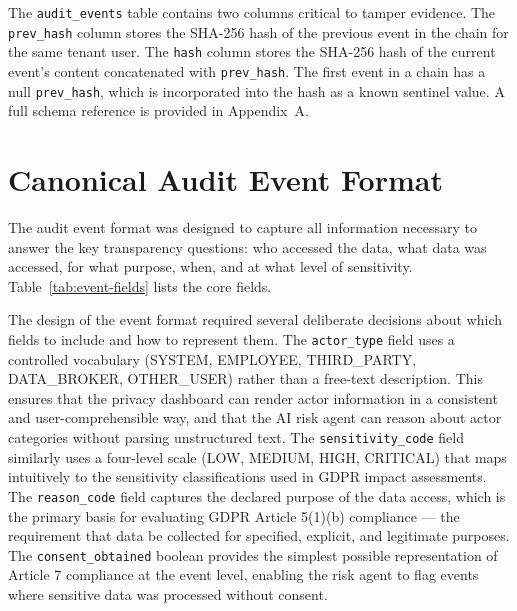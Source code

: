 \documentclass[a4paper,12pt,onecolumn]{report}
\begin{document}
The \texttt{audit\_events} table contains two columns critical to tamper evidence.
The \texttt{prev\_hash} column stores the SHA-256 hash of the previous event in the chain for the same tenant user.
The \texttt{hash} column stores the SHA-256 hash of the current event's content concatenated with \texttt{prev\_hash}.
The first event in a chain has a null \texttt{prev\_hash}, which is incorporated into the hash as a known sentinel value.
A full schema reference is provided in Appendix~A.

\section{Canonical Audit Event Format}

The audit event format was designed to capture all information necessary to answer the key transparency questions: who accessed the data, what data was accessed, for what purpose, when, and at what level of sensitivity.
Table~\ref{tab:event-fields} lists the core fields.

The design of the event format required several deliberate decisions about which fields to include and how to represent them.
The \texttt{actor\_type} field uses a controlled vocabulary (SYSTEM, EMPLOYEE, THIRD\_PARTY, DATA\_BROKER, OTHER\_USER) rather than a free-text description.
This ensures that the privacy dashboard can render actor information in a consistent and user-comprehensible way, and that the AI risk agent can reason about actor categories without parsing unstructured text.
The \texttt{sensitivity\_code} field similarly uses a four-level scale (LOW, MEDIUM, HIGH, CRITICAL) that maps intuitively to the sensitivity classifications used in GDPR impact assessments.
The \texttt{reason\_code} field captures the declared purpose of the data access, which is the primary basis for evaluating GDPR Article 5(1)(b) compliance --- the requirement that data be collected for specified, explicit, and legitimate purposes.
The \texttt{consent\_obtained} boolean provides the simplest possible representation of Article 7 compliance at the event level, enabling the risk agent to flag events where sensitive data was processed without consent.
\end{document}
